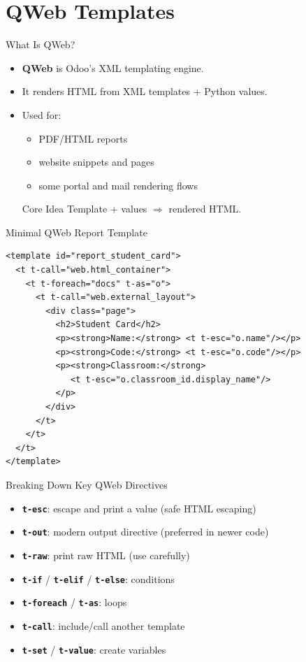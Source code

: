 \section{QWeb Templates}

\begin{frame}[fragile]{What Is QWeb?}
	\begin{itemize}
		\item \textbf{QWeb} is Odoo's XML templating engine.
		\item It renders HTML from XML templates + Python values.
		\item Used for:
		\begin{itemize}
			\item PDF/HTML reports
			\item website snippets and pages
			\item some portal and mail rendering flows
		\end{itemize}
\begin{block}{Core Idea}
	Template + values $\Rightarrow$ rendered HTML.
\end{block}
	\end{itemize}
\end{frame}

\begin{frame}[fragile]{Minimal QWeb Report Template}
\begin{lstlisting}[style=xml]
<template id="report_student_card">
  <t t-call="web.html_container">
	<t t-foreach="docs" t-as="o">
	  <t t-call="web.external_layout">
		<div class="page">
		  <h2>Student Card</h2>
		  <p><strong>Name:</strong> <t t-esc="o.name"/></p>
		  <p><strong>Code:</strong> <t t-esc="o.code"/></p>
		  <p><strong>Classroom:</strong>
			 <t t-esc="o.classroom_id.display_name"/>
		  </p>
		</div>
	  </t>
	</t>
  </t>
</template>
\end{lstlisting}
\end{frame}

\begin{frame}[fragile]{Breaking Down Key QWeb Directives}
	\begin{itemize}
		\item \textbf{\texttt{t-esc}}: escape and print a value (safe HTML escaping)
		\item \textbf{\texttt{t-out}}: modern output directive (preferred in newer code)
		\item \textbf{\texttt{t-raw}}: print raw HTML (use carefully)
		\item \textbf{\texttt{t-if}} / \textbf{\texttt{t-elif}} / \textbf{\texttt{t-else}}: conditions
		\item \textbf{\texttt{t-foreach}} / \textbf{\texttt{t-as}}: loops
		\item \textbf{\texttt{t-call}}: include/call another template
		\item \textbf{\texttt{t-set}} / \textbf{\texttt{t-value}}: create variables
	\end{itemize}
\end{frame}

